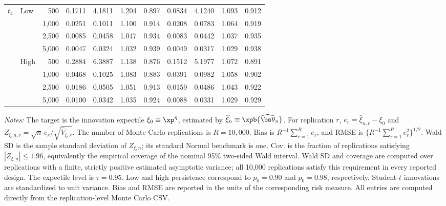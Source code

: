\begin{table}[!p]
\begin{tabular}{llr*{8}{r}}
\addlinespace[3pt]
$t_4$ & Low & 500 & 0.1711 & 4.1811 & 1.204 & 0.897 & 0.0834 & 4.1240 & 1.093 & 0.912\\
 &  & 1,000 & 0.0251 & 0.1011 & 1.100 & 0.914 & 0.0208 & 0.0783 & 1.064 & 0.919\\
 &  & 2,500 & 0.0085 & 0.0458 & 1.047 & 0.934 & 0.0083 & 0.0442 & 1.037 & 0.935\\
 &  & 5,000 & 0.0047 & 0.0324 & 1.032 & 0.939 & 0.0049 & 0.0317 & 1.029 & 0.938\\
\addlinespace[1pt]
 & High & 500 & 0.2884 & 6.3887 & 1.138 & 0.876 & 0.1512 & 5.1977 & 1.072 & 0.891\\
 &  & 1,000 & 0.0468 & 0.1025 & 1.083 & 0.883 & 0.0391 & 0.0982 & 1.058 & 0.902\\
 &  & 2,500 & 0.0186 & 0.0505 & 1.051 & 0.913 & 0.0159 & 0.0486 & 1.043 & 0.922\\
 &  & 5,000 & 0.0100 & 0.0342 & 1.035 & 0.924 & 0.0088 & 0.0331 & 1.029 & 0.929\\
\bottomrule
\end{tabular}
\begin{minipage}{0.98\textwidth}\footnotesize\vspace{4pt}
\textit{Notes:} The target is the innovation expectile $\xi_0\equiv\xp^\eta$, estimated by $\widehat\xi_n\equiv\xpb{\widehat{\bs\theta}_n}$. For replication $r$, $e_r=\widehat\xi_{n,r}-\xi_0$ and $Z_{\xi,n,r}=\sqrt n\,e_r/\sqrt{\widehat V_{\xi,r}}$. The number of Monte Carlo replications is $R=10{,}000$. Bias is $R^{-1}\sum_{r=1}^{R}e_r$, and RMSE is $\{R^{-1}\sum_{r=1}^{R}e_r^2\}^{1/2}$. Wald SD is the sample standard deviation of $Z_{\xi,n}$; its standard Normal benchmark is one. Cov. is the fraction of replications satisfying $|Z_{\xi,n}|\leq 1.96$, equivalently the empirical coverage of the nominal 95\% two-sided Wald interval. Wald SD and coverage are computed over replications with a finite, strictly positive estimated asymptotic variance; all 10,000 replications satisfy this requirement in every reported design. The expectile level is $\tau=0.95$. Low and high persistence correspond to $p_0=0.90$ and $p_0=0.98$, respectively. Student-$t$ innovations are standardized to unit variance. Bias and RMSE are reported in the units of the corresponding risk measure. All entries are computed directly from the replication-level Monte Carlo CSV.
\end{minipage}
\end{table}

